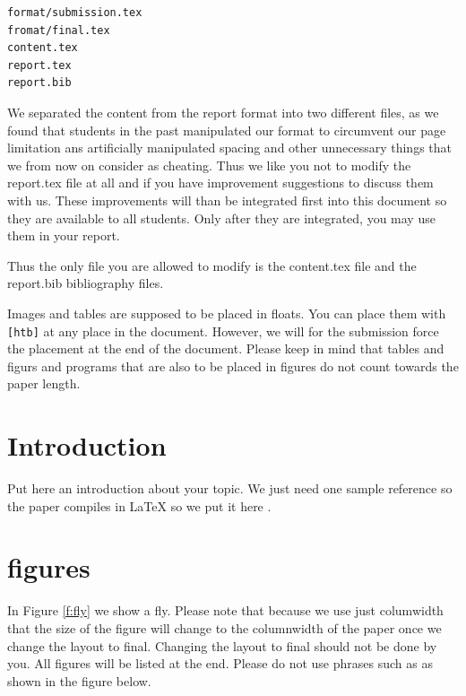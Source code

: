 \begin{verbatim}
format/submission.tex
fromat/final.tex
content.tex
report.tex
report.bib
\end{verbatim}

We separated the content from the report format into two different
files, as we found that students in the past manipulated our format to
circumvent our page limitation ans artificially manipulated spacing and
other unnecessary things that we from now on consider as cheating.
Thus we like you not to modify the report.tex file at all and if you
have improvement suggestions to discuss them with us. These
improvements will than be integrated first into this document so they
are available to all students. Only after they are integrated, you may
use them in your report. 

Thus the only file you are allowed to modify is the content.tex file
and the report.bib bibliography files.

Images and tables are supposed to be placed in floats. You can place
them with \verb|[htb]| at any place in the document. However, we will
for the submission force the placement at the end of the
document. Please keep in mind that tables and figurs and programs
that are also to be placed in figures do not count towards the paper length.

\section{Introduction}

Put here an introduction about your topic. 
We just need one sample reference so the paper compiles in LaTeX so we
put it here \cite{editor00}.

\section{figures}

In Figure \ref{f:fly} we show a fly. Please note that because we use
just columwidth that the size of the figure will change to the
columnwidth of the paper once we change the layout to final. Changing
the layout to final should not be done by you. All figures will be
listed at the end. Please do not use phrases such as as shown in the
figure below.

